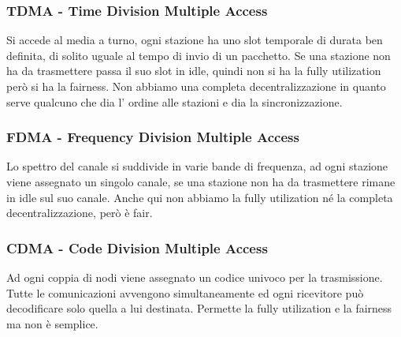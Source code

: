 \subsubsection{TDMA - Time Division Multiple Access}
Si accede al media a turno, ogni stazione ha uno slot temporale di durata ben definita, di solito uguale al tempo di invio di un pacchetto.
Se una stazione non ha da trasmettere passa il suo slot in idle, quindi non si ha la fully utilization però si ha la fairness.
Non abbiamo una completa decentralizzazione in quanto serve qualcuno che dia l' ordine alle stazioni e dia la sincronizzazione.

\subsubsection{FDMA - Frequency Division Multiple Access}
Lo spettro del canale si suddivide in varie bande di frequenza, ad ogni stazione viene assegnato un singolo canale, se una stazione non ha da trasmettere rimane in idle sul suo canale.
Anche qui non abbiamo la fully utilization né la completa decentralizzazione, però è fair.

\subsubsection{CDMA - Code Division Multiple Access}
Ad ogni coppia di nodi viene assegnato un codice univoco per la trasmissione.
Tutte le comunicazioni avvengono simultaneamente ed ogni ricevitore può decodificare solo quella a lui destinata.
Permette la fully utilization e la fairness ma non è semplice.

